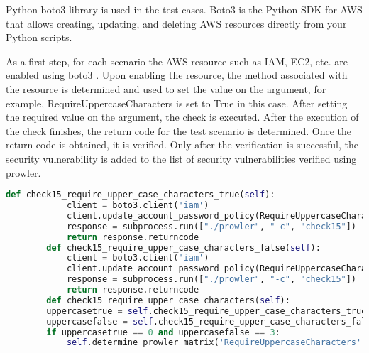 \par Python boto3 \cite{67} library is used in the test cases.
Boto3 is the Python SDK for AWS
that allows creating, updating, and deleting AWS resources directly from your Python
scripts.

\par As a first step, for each scenario the AWS resource such as IAM, EC2, etc. are enabled using boto3 \cite{67}. Upon enabling the resource, the method associated with the resource is determined and used to set the value on the argument, for example, RequireUppercaseCharacters is set to True in this case. After setting the required value on the argument, the check is executed. After the execution of the check finishes, the return code for the test scenario is determined. Once the return code is obtained, it is verified. Only after the verification is successful, the security vulnerability is added to the list of security vulnerabilities verified using prowler.


\lstset{frame=lines}
\lstset{basicstyle=\footnotesize\ttfamily}

\begin{lstlisting}[language=Python]
	def check15_require_upper_case_characters_true(self):
            client = boto3.client('iam')
            client.update_account_password_policy(RequireUppercaseCharacters=True)
            response = subprocess.run(["./prowler", "-c", "check15"])
            return response.returncode
        def check15_require_upper_case_characters_false(self):
            client = boto3.client('iam')
            client.update_account_password_policy(RequireUppercaseCharacters=False)
            response = subprocess.run(["./prowler", "-c", "check15"])
            return response.returncode
        def check15_require_upper_case_characters(self):
	    uppercasetrue = self.check15_require_upper_case_characters_true()
	    uppercasefalse = self.check15_require_upper_case_characters_false()
	    if uppercasetrue == 0 and uppercasefalse == 3:
	        self.determine_prowler_matrix('RequireUppercaseCharacters')
\end{lstlisting}


